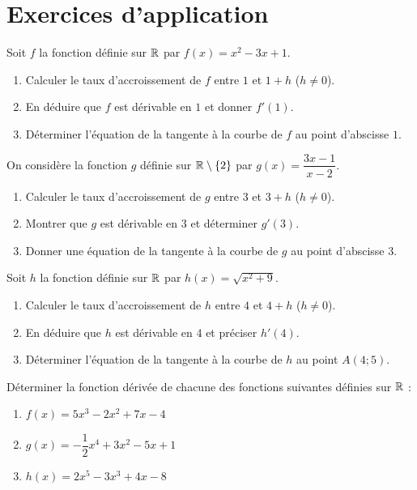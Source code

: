 \section{Exercices d'application}


\exo{}
Soit $f$ la fonction définie sur $\mathbb{R}$ par $f(x)=x^2-3x+1$.
\begin{enumerate}[label=\alph*)]
\item Calculer le taux d'accroissement de $f$ entre $1$ et $1+h$ ($h\neq0$).
\item En déduire que $f$ est dérivable en $1$ et donner $f'(1)$.
\item Déterminer l'équation de la tangente à la courbe de $f$ au point d'abscisse $1$.
\end{enumerate}

\exo{}
On considère la fonction $g$ définie sur $\mathbb{R}\setminus\{2\}$ par $g(x)=\dfrac{3x-1}{x-2}$.
\begin{enumerate}[label=\alph*)]
\item Calculer le taux d'accroissement de $g$ entre $3$ et $3+h$ ($h\neq0$).
\item Montrer que $g$ est dérivable en $3$ et déterminer $g'(3)$.
\item Donner une équation de la tangente à la courbe de $g$ au point d'abscisse $3$.
\end{enumerate}

\exo{}
Soit $h$ la fonction définie sur $\mathbb{R}$ par $h(x)=\sqrt{x^2+9}$.
\begin{enumerate}[label=\alph*)]
\item Calculer le taux d'accroissement de $h$ entre $4$ et $4+h$ ($h\neq0$).
\item En déduire que $h$ est dérivable en $4$ et préciser $h'(4)$.
\item Déterminer l'équation de la tangente à la courbe de $h$ au point $A(4;5)$.
\end{enumerate}


\exo{}
Déterminer la fonction dérivée de chacune des fonctions suivantes définies sur $\mathbb{R}$ :
\begin{enumerate}[label=\alph*)]
\item $f(x)=5x^3-2x^2+7x-4$
\item $g(x)=-\dfrac{1}{2}x^4+3x^2-5x+1$
\item $h(x)=2x^5-3x^3+4x-8$
\end{enumerate}

